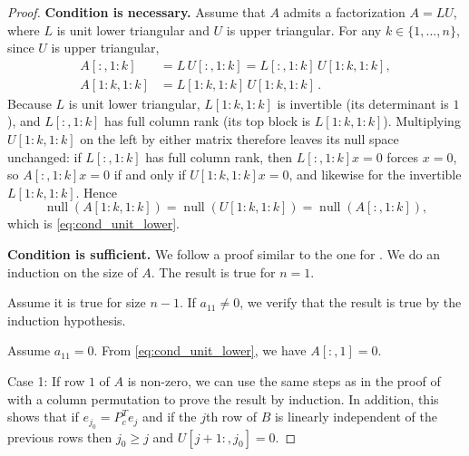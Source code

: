 \documentclass[final]{siamart1116}
\numberwithin{theorem}{section}
\DeclareMathOperator{\nl}{null}
\begin{document}
\begin{proof} \par
  \textbf{Condition is necessary.} \quad Assume that $A$ admits a factorization $A = LU$, where $L$ is unit lower triangular and $U$ is upper triangular. For any $k \in \{1, \dots, n\}$, since $U$ is upper triangular,
  \begin{align*}
    A[:, 1:k]   & = L\, U[:, 1:k] = L[:, 1:k]\, U[1:k, 1:k], \\
    A[1:k, 1:k] & = L[1:k, 1:k]\, U[1:k, 1:k] \,.
  \end{align*}
  Because $L$ is unit lower triangular, $L[1:k, 1:k]$ is invertible (its determinant is $1$), and $L[:, 1:k]$ has full column rank (its top block is $L[1:k, 1:k]$). Multiplying $U[1:k, 1:k]$ on the left by either matrix therefore leaves its null space unchanged: if $L[:, 1:k]$ has full column rank, then $L[:, 1:k] x = 0$ forces $x = 0$, so $A[:, 1:k] x = 0$ if and only if $U[1:k, 1:k] x = 0$, and likewise for the invertible $L[1:k, 1:k]$. Hence
  \[
    \nl(A[1:k, 1:k]) = \nl(U[1:k, 1:k]) = \nl(A[:, 1:k]),
  \]
  which is \cref{eq:cond_unit_lower}.

  \noindent\textbf{Condition is sufficient.} \quad We follow a proof similar to the one for . We do an induction on the size of $A$. The result is true for $n=1$.

  Assume it is true for size $n-1$. If $a_{11} \neq 0$, we verify that the result is true by the induction hypothesis.

  Assume $a_{11} = 0$. From \cref{eq:cond_unit_lower}, we have $A[:,1] = 0$.

  Case 1: If row $1$ of $A$ is non-zero, we can use the same steps as in the proof of  with a column permutation to prove the result by induction. In addition, this shows that if $e_{j_0} = P_c^T e_j$ and if the $j$th row of $B$ is linearly independent of the previous rows then $j_0 \ge j$ and $U[j+1:,j_0] = 0$.


\end{proof}
\end{document}
